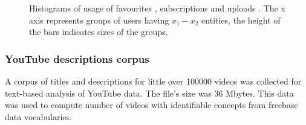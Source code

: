 \begin{figure}[htb]
  \centering
  \label{fig:subfigureExample}
  \caption{Histograms of usage of favourites , subscriptions
   and uploads . The x axis represents groups of
  users having $x_1-x_2$ entities, the height of the bars indicates sizes of the
  groups.}
\end{figure}


\subsubsection{YouTube descriptions corpus}

A corpus of titles and descriptions for little over 100000 videos was collected
for text-based analysis of YouTube data. The file's size was 36 Mbytes. This
data was used to compute number of videos with identifiable concepts from
freebase data vocabularies.

